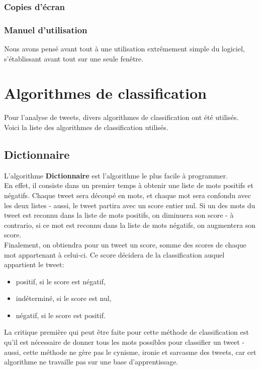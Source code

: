 \documentclass[pdftex,12pt,a4paper]{report}
\begin{document}
\begin{spacing}{1.2}
\subsection{Copies d'écran}

\subsection{Manuel d'utilisation}

Nous avons pensé avant tout à une utilisation extrêmement simple du logiciel, s'établissant avant tout sur une seule fenêtre.\\

\chapter{Algorithmes de classification}

Pour l'analyse de tweets, divers algorithmes de classification ont été utilisés.\\
Voici la liste des algorithmes de classification utilisés.

\section{Dictionnaire}

L'algorithme \textbf{Dictionnaire} est l'algorithme le plus facile à programmer.\\
En effet, il consiste dans un premier temps à obtenir une liste de mots positifs et négatifs. Chaque tweet sera découpé en mots, et chaque mot sera confondu avec les deux listes - aussi, le tweet partira avec un score entier nul. Si un des mots du tweet est reconnu dans la liste de mots positifs, on diminuera son score - à contrario, si ce mot est reconnu dans la liste de mots négatifs, on augmentera son score.\\
Finalement, on obtiendra pour un tweet un score, somme des scores de chaque mot appartenant à celui-ci. Ce score décidera de la classification auquel appartient le tweet:
\begin{itemize}
\item{positif, si le score est négatif,}
\item{indéterminé, si le score est nul,}
\item{négatif, si le score est positif.}
\end{itemize}
La critique première qui peut être faite pour cette méthode de classification est qu'il est nécessaire de donner tous les mots possibles pour classifier un tweet - aussi, cette méthode ne gère pas le cynisme, ironie et sarcasme des tweets, car cet algorithme ne travaille pas sur une base d'apprentissage.


\end{spacing}
\end{document}
